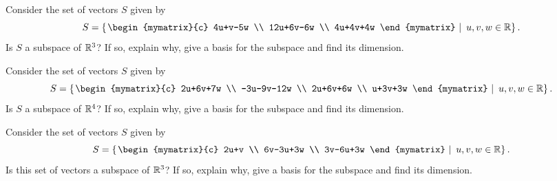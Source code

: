 \begin{enumialphparenastyle}
\begin{ex}
  Consider the set of vectors $S$ given by  
  \begin{equation*}
    S = 
    \set{\left.\begin{mymatrix}{c}
        4u+v-5w \\ 
        12u+6v-6w \\ 
        4u+4v+4w
      \end{mymatrix} ~\right\vert~u,v,w\in \R} .
  \end{equation*}
  Is $S$ a subspace of $\mathbb{R}^{3}$? If so, explain why,
  give a basis for the subspace and find its dimension.
\end{ex}

\begin{ex}
  Consider the set of vectors $S$ given by 
  \begin{equation*}
    S = 
    \set{\left.\begin{mymatrix}{c}
        2u+6v+7w \\ 
        -3u-9v-12w \\ 
        2u+6v+6w \\ 
        u+3v+3w
      \end{mymatrix} ~\right\vert~u,v,w\in \R} .
  \end{equation*}
  Is $S$ a subspace of $\mathbb{R}^{4}$? If so, explain why,
  give a basis for the subspace and find its dimension.
\end{ex}

\begin{ex}
  Consider the set of vectors $S$ given by 
  \begin{equation*}
    S = 
    \set{\left.\begin{mymatrix}{c}
        2u+v \\ 
        6v-3u+3w \\ 
        3v-6u+3w
      \end{mymatrix} ~\right\vert~u,v,w\in \R} .
  \end{equation*}
  Is this set of vectors a subspace of $\mathbb{R}^{3}$? If so, explain why,
  give a basis for the subspace and find its dimension.
\end{ex}


\end{enumialphparenastyle}
